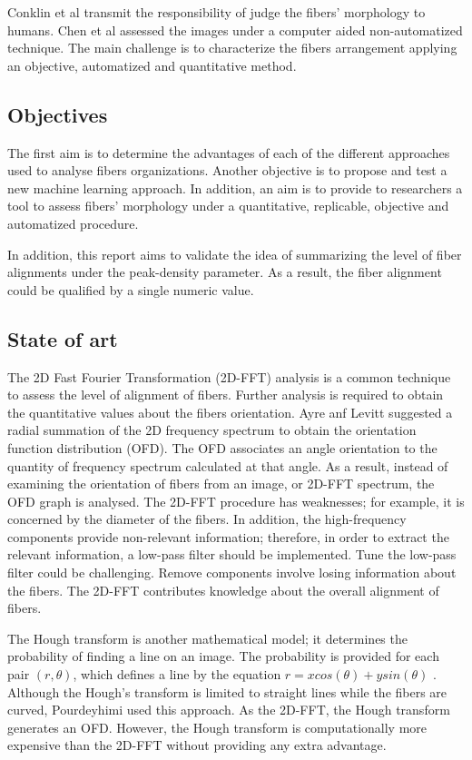 \documentclass[12pt,a4paper]{article}
\begin{document}
Conklin et al transmit the responsibility of judge the fibers' morphology to humans. Chen et al assessed the images under a computer aided non-automatized technique. The  main challenge is to characterize the fibers arrangement applying an objective, automatized and quantitative method.
\subsection{Objectives}
The first aim is to determine the advantages of each of the different approaches used to analyse fibers organizations. Another objective is to propose and test a new machine learning approach. In addition, an aim is to provide to researchers a tool to assess fibers’ morphology under a quantitative, replicable, objective and automatized procedure.

In addition, this report aims to validate the idea of summarizing the level of fiber alignments under the peak-density parameter. As a result, the fiber alignment could be qualified by a single numeric value.
\subsection{State of art}
The 2D Fast Fourier Transformation (2D-FFT) analysis is a common technique to assess the level of alignment of fibers. Further analysis is required to obtain the quantitative values about the fibers orientation. Ayre anf Levitt suggested a radial summation of the 2D frequency spectrum to obtain the orientation function distribution (OFD). The OFD associates an angle orientation to the quantity of frequency spectrum calculated at that angle. As a result, instead of examining the orientation of fibers from an image, or 2D-FFT spectrum, the OFD graph is analysed. The 2D-FFT procedure has weaknesses; for example, it is concerned by the diameter of the fibers. In addition, the high-frequency components provide non-relevant information; therefore, in order to extract the relevant information, a low-pass filter should be implemented. Tune the low-pass filter could be challenging. Remove components involve losing information about the fibers. The 2D-FFT contributes knowledge about the overall alignment of fibers.

The Hough transform is another mathematical model; it determines the probability of finding a line on an image. The probability is provided for each pair $(r,\theta)$, which defines a line by the equation $r=xcos(\theta)+ysin(\theta)$ .  Although the Hough’s transform is limited to straight lines while the fibers are curved, Pourdeyhimi used this approach. As the 2D-FFT, the Hough transform generates an OFD. However, the Hough transform is computationally more expensive than the 2D-FFT without providing any extra advantage.
\end{document}
